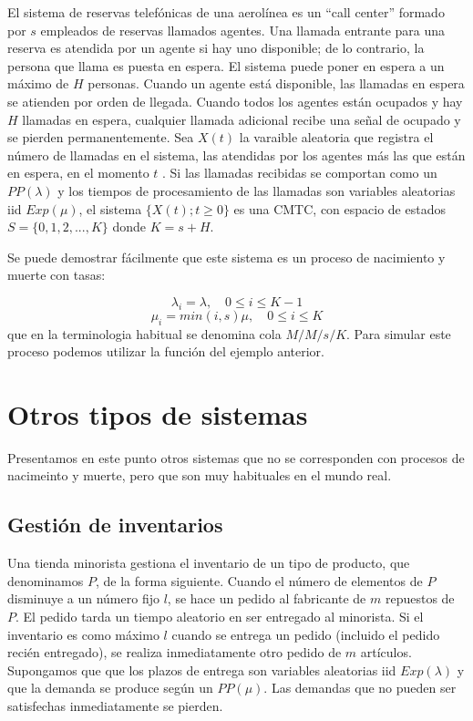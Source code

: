 \documentclass[
]{book}
\theoremstyle{definition}
\theoremstyle{definition}
\theoremstyle{definition}
\theoremstyle{definition}
\theoremstyle{remark}
\begin{document}
El sistema de reservas telefónicas de una aerolínea es un ``call center'' formado por \(s\) empleados de reservas llamados agentes. Una llamada entrante para una reserva es atendida por un agente si hay uno disponible; de lo contrario, la persona que llama es puesta en espera. El sistema puede poner en espera a un máximo de \(H\) personas.
Cuando un agente está disponible, las llamadas en espera se atienden por orden de llegada. Cuando todos los agentes están ocupados y hay \(H\) llamadas en espera, cualquier llamada adicional recibe una señal de ocupado y se pierden permanentemente. Sea \(X(t)\) la varaible aleatoria que registra el número de llamadas en el sistema, las atendidas por los agentes más las que están en espera, en el momento \(t\) . Si las llamadas recibidas se comportan como un \(PP(\lambda)\) y los tiempos de procesamiento de las llamadas son variables aleatorias iid \(Exp(\mu)\), el sistema \(\{X(t); t \geq 0\}\) es una CMTC, con espacio de estados \(S = \{0, 1, 2,...,K\}\) donde \(K = s + H\).

Se puede demostrar fácilmente que este sistema es un proceso de nacimiento y muerte con tasas:

\[\lambda_i = \lambda, \quad 0 \leq i \leq K-1\]
\[\mu_i = min(i, s)\mu, \quad 0 \leq i \leq K\]
que en la terminologia habitual se denomina cola \(M/M/s/K\). Para simular este proceso podemos utilizar la función del ejemplo anterior.

\hypertarget{CMTCE}{%
\section{Otros tipos de sistemas}\label{CMTCE}}

Presentamos en este punto otros sistemas que no se corresponden con procesos de nacimeinto y muerte, pero que son muy habituales en el mundo real.

\hypertarget{gestiuxf3n-de-inventarios}{%
\subsection{Gestión de inventarios}\label{gestiuxf3n-de-inventarios}}

Una tienda minorista gestiona el inventario de un tipo de producto, que denominamos \(P\), de la forma siguiente. Cuando el número de elementos de \(P\) disminuye a un número fijo \(l\), se hace un pedido al fabricante de \(m\) repuestos de \(P\). El pedido tarda un tiempo aleatorio en ser entregado al minorista. Si el inventario es como máximo \(l\) cuando se entrega un pedido (incluido el pedido recién entregado), se realiza inmediatamente otro pedido de \(m\) artículos. Supongamos que
que los plazos de entrega son variables aleatorias iid \(Exp(\lambda)\) y que la demanda se produce según un \(PP(\mu)\). Las demandas que no pueden ser satisfechas inmediatamente se pierden.
\end{document}
